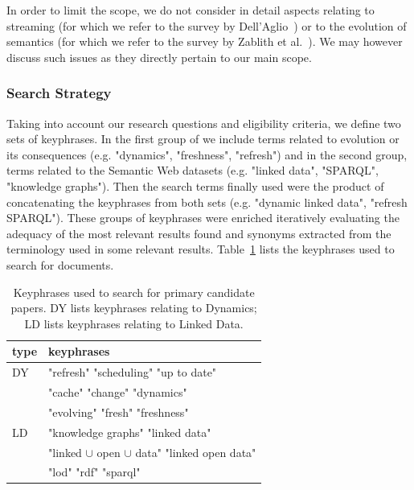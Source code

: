 \documentclass[sw]{iosart2x}
\begin{document}
In order to limit the scope, we do not consider in detail aspects relating to streaming (for which we refer to the survey by Dell'Aglio~\cite{DellAglioVHB17}) or to the evolution of semantics (for which we refer to the survey by Zablith et al.~\cite{ZablithAdFKMPS15}). We may however discuss such issues as they directly pertain to our main scope.

\subsubsection{Search Strategy}\label{Search}

Taking into account our research questions and eligibility criteria, we define two sets of keyphrases. In the first group of we include terms related to evolution or its consequences (e.g. "dynamics", "freshness", "refresh") and in the second group, terms related to the Semantic Web datasets (e.g. "linked data", "SPARQL", "knowledge graphs"). Then the search terms finally used were the product of concatenating the keyphrases from both sets (e.g. "dynamic linked data", "refresh SPARQL"). These groups of keyphrases were enriched iteratively evaluating the adequacy of the most relevant results found and synonyms extracted from the terminology used in some relevant results. Table~\ref{tab:terms} lists the keyphrases used to search for documents.


\begin{table}[]
	\centering
	\caption{Keyphrases used to search for primary candidate papers. DY lists keyphrases relating to Dynamics; LD lists keyphrases relating to Linked Data.}
	\label{tab:terms}
	\begin{tabular}{ll} 
		\hline
		type & keyphrases  \\ \hline
		DY    & "refresh"
		"scheduling"
		"up to date" \\ &
		"cache"
		"change"
		"dynamics" \\ &
		"evolving"
		"fresh"
		"freshness"            \\ \hline
		LD    & "knowledge graphs"
		"linked data" \\ &
		"linked $\cup$ open $\cup$ data"
		"linked open data" \\ &
		"lod"
		"rdf"
		"sparql"           \\ \hline
	\end{tabular}
\end{table}

\end{document}

